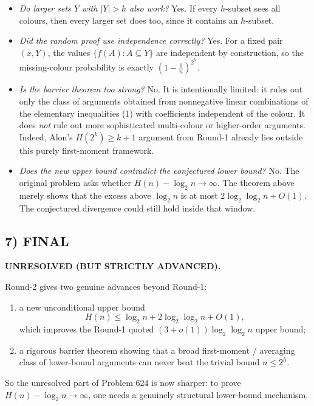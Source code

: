 \begin{itemize}
\item \emph{Do larger sets $Y$ with $|Y|>h$ also work?}
Yes. If every $h$-subset sees all colours, then every larger set does too, since it contains an $h$-subset.

\item \emph{Did the random proof use independence correctly?}
Yes. For a fixed pair $(x,Y)$, the values $\{f(A):A\subseteq Y\}$ are independent by construction,
so the missing-colour probability is exactly $(1-\frac1n)^{2^h}$.

\item \emph{Is the barrier theorem too strong?}
No. It is intentionally limited: it rules out only the class of arguments obtained from nonnegative
linear combinations of the elementary inequalities (1) with coefficients independent of the colour.
It does \emph{not} rule out more sophisticated multi-colour or higher-order arguments.
Indeed, Alon's $H(2^k)\ge k+1$ argument from Round-1 already lies outside this purely first-moment framework.

\item \emph{Does the new upper bound contradict the conjectured lower bound?}
No. The original problem asks whether $H(n)-\log_2 n\to\infty$.
The theorem above merely shows that the excess above $\log_2 n$ is at most $2\log_2\log_2 n+O(1)$.
The conjectured divergence could still hold inside that window.
\end{itemize}

\subsection*{7) FINAL}

\textbf{UNRESOLVED (BUT STRICTLY ADVANCED).}

Round-2 gives two genuine advances beyond Round-1:

\begin{enumerate}
\item a new unconditional upper bound
\[
H(n)\le \log_2 n + 2\log_2\log_2 n + O(1),
\]
which improves the Round-1 quoted $(3+o(1))\log_2\log_2 n$ upper bound;

\item a rigorous barrier theorem showing that a broad first-moment / averaging class of lower-bound
arguments can never beat the trivial bound $n\le 2^h$.
\end{enumerate}

So the unresolved part of Problem 624 is now sharper:
to prove $H(n)-\log_2 n\to\infty$, one needs a genuinely structural lower-bound mechanism.

